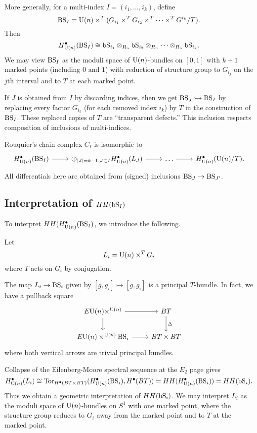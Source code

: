 More generally, for a multi-index $I = (i_1, \dots, i_k)$, define
\[
	\mathrm{BS}_I = \mathrm{U}(n) \times^T (G_{i_1} \times^T G_{i_2} \times^T \dots \times^T G^{i_k} / T).
\]
Then
\[
	H^\bullet_{\mathrm{U}(n)}(\mathrm{BS}_I) \cong \mathrm{bS}_{i_1} \otimes_{R_n} \mathrm{bS}_{i_2} \otimes_{R_n} \dots \otimes_{R_n} \mathrm{bS}_{i_k}.
\]
We may view $\mathrm{BS}_I$ as the moduli space of $\mathrm{U}(n)$-bundles on $[0, 1]$ with $k + 1$ marked points (including $0$ and $1$) with reduction of structure group to $G_{i_j}$ on the $j$th interval and to $T$ at each marked point.

If $J$ is obtained from $I$ by discarding indices, then we get $\mathrm{BS}_J \hookrightarrow \mathrm{BS}_I$ by replacing every factor $G_{i_k}$ (for each removed index $i_k$) by $T$ in the construction of $\mathrm{BS}_I$.
These replaced copies of $T$ are ``transparent defects.''
This inclusion respects composition of inclusions of multi-indices.

Rouquier's chain complex $C_I$ is isomorphic to
\[
	\begin{tikzcd}
		H^\bullet_{\U(n)}(\BS_I) \rar & \oplus_{\abs{J} = k-1, J \subset I} H^\bullet_{\U(n)}(L_J) \rar & \dots \rar & H^\bullet_{\U(n)}(\U(n)/T).
	\end{tikzcd}
\]
All differentials here are obtained from (signed) inclusions $\mathrm{BS}_J \to \mathrm{BS}_{J'}$.

\subsection{Interpretation of $HH(\mathrm{bS}_I)$}

To interpret $HH(H^\bullet_{\mathrm{U}(n)}(\mathrm{BS}_I)$, we introduce the following.

\begin{dfn}
	Let
	\[
		L_i = \mathrm{U}(n) \times^T G_i
	\]
	where $T$ acts on $G_i$ by conjugation.
\end{dfn}

The map $L_i \to \mathrm{BS}_i$ given by $[g, g_i] \mapsto [g, g_i]$ is a principal $T$-bundle.
In fact, we have a pullback square
\[
	\begin{tikzcd}
		E\U(n) \times^{\U(n)} \rar \dar & BT \dar["\Delta"] \\
		E\U(n) \times^{\U(n)} \BS_i \rar & BT \times BT
	\end{tikzcd}
\]
where both vertical arrows are trivial principal bundles.

Collapse of the Eilenberg-Moore spectral sequence at the $E_2$ page gives
\[
	H^\bullet_{\mathrm{U}(n)}(L_i) \cong \operatorname{Tor}_{H^\bullet(BT \times BT)}(H^\bullet_{\mathrm{U}(n)}(\mathrm{BS}_i), H^\bullet(BT)) = HH(H^\bullet_{\mathrm{U}(n)}(\mathrm{BS}_i)) = HH(\mathrm{bS}_i).
\]
Thus we obtain a geometric interpretation of $HH(\mathrm{bS}_i)$.
We may interpret $L_i$ as the moduli space of $\mathrm{U}(n)$-bundles on $S^1$ with one marked point, where the structure group reduces to $G_i$ away from the marked point and to $T$ at the marked point.

